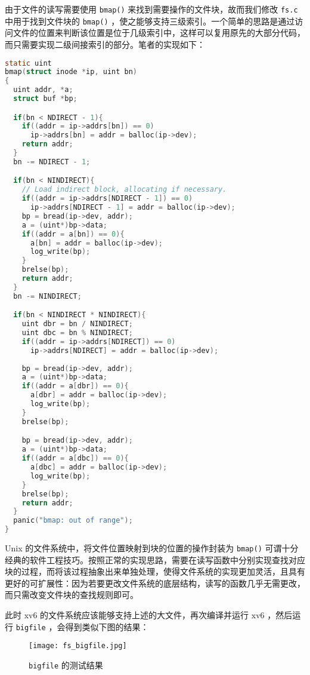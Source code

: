 由于文件的读写需要使用 \lstinline{bmap()} 来找到需要操作的文件块，故而我们修改 \lstinline{fs.c} 中用于找到文件块的 \lstinline{bmap()} ，使之能够支持三级索引。一个简单的思路是通过访问文件的位置来判断该位置是位于几级索引中，这样可以复用原先的大部分代码，而只需要实现二级间接索引的部分。笔者的实现如下：
\begin{lstlisting}[language=C]
static uint
bmap(struct inode *ip, uint bn)
{
  uint addr, *a;
  struct buf *bp;

  if(bn < NDIRECT - 1){
    if((addr = ip->addrs[bn]) == 0)
      ip->addrs[bn] = addr = balloc(ip->dev);
    return addr;
  }
  bn -= NDIRECT - 1;

  if(bn < NINDIRECT){
    // Load indirect block, allocating if necessary.
    if((addr = ip->addrs[NDIRECT - 1]) == 0)
      ip->addrs[NDIRECT - 1] = addr = balloc(ip->dev);
    bp = bread(ip->dev, addr);
    a = (uint*)bp->data;
    if((addr = a[bn]) == 0){
      a[bn] = addr = balloc(ip->dev);
      log_write(bp);
    }
    brelse(bp);
    return addr;
  }
  bn -= NINDIRECT;

  if(bn < NINDIRECT * NINDIRECT){
    uint dbr = bn / NINDIRECT;
    uint dbc = bn % NINDIRECT;
    if((addr = ip->addrs[NDIRECT]) == 0)
      ip->addrs[NDIRECT] = addr = balloc(ip->dev);
    
    bp = bread(ip->dev, addr);
    a = (uint*)bp->data;
    if((addr = a[dbr]) == 0){
      a[dbr] = addr = balloc(ip->dev);
      log_write(bp);
    }
    brelse(bp);

    bp = bread(ip->dev, addr);
    a = (uint*)bp->data;
    if((addr = a[dbc]) == 0){
      a[dbc] = addr = balloc(ip->dev);
      log_write(bp);
    }
    brelse(bp);
    return addr;
  }
  panic("bmap: out of range");
}
\end{lstlisting}

\begin{proposition} 
    Unix 的文件系统中，将文件位置映射到块的位置的操作封装为 \lstinline{bmap()} 可谓十分经典的软件工程技巧。按照正常的实现思路，需要在读写函数中分别实现查找对应块的过程，而将该过程抽象出来单独处理，使得文件系统的实现更加灵活，且具有更好的可扩展性：因为若要更改文件系统的底层结构，读写的函数几乎无需更改，而只需改变文件块的查找规则即可。
\end{proposition}

此时 xv6 的文件系统应该能够支持上述的大文件，再次编译并运行 xv6 ，然后运行 \lstinline{bigfile} ，会得到类似下图的结果：
\begin{figure}[H]
  \centering
  \texttt{[image: fs\_bigfile.jpg]}
  \caption{ \lstinline{bigfile} 的测试结果}
\end{figure}


